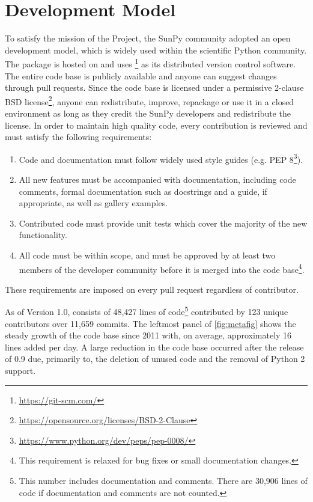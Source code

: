 \section{Development Model}
\label{sec:development}

To satisfy the mission of the Project, the SunPy community adopted an open development model, which is widely used within the scientific Python community.
The \sunpypkg package is hosted on \github and uses \footnote{\url{https://git-scm.com/}} as its distributed version control software.
The entire code base is publicly available and anyone can suggest changes through pull requests.
Since the code base is licensed under a permissive 2-clause BSD license\footnote{\url{https://opensource.org/licenses/BSD-2-Clause}}, anyone can redistribute, improve, repackage or use it in a closed environment as long as they credit the SunPy developers and redistribute the license.
In order to maintain high quality code, every contribution is reviewed and must satisfy the following requirements:
\begin{enumerate}
    \item Code and documentation must follow widely used style guides (e.g. PEP 8\footnote{\url{https://www.python.org/dev/peps/pep-0008/}}).
    \item All new features must be accompanied with documentation, including code comments, formal documentation such as \python docstrings and a guide, if appropriate, as well as gallery examples.
    \item Contributed code must provide unit tests which cover the majority of the new functionality.
    \item All code must be within scope, and must be approved by at least two members of the developer community before it is merged into the code base\footnote{This requirement is relaxed for bug fixes or small documentation changes.}.
\end{enumerate}
These requirements are imposed on every pull request regardless of contributor.

As of Version 1.0, \sunpypkg consists of 48,427 lines of code\footnote{This number includes documentation and comments.
There are 30,906 lines of code if documentation and comments are not counted.} contributed by 123 unique contributors over 11,659 commits.
The leftmost panel of \autoref{fig:metafig} shows the steady growth of the code base since 2011 with, on average, approximately 16 lines added per day.
A large reduction in the code base occurred after the release of 0.9 due, primarily to, the deletion of unused code and the removal of Python 2 support.

